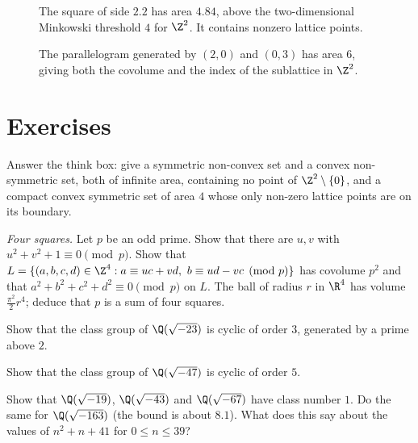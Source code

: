 \begin{figure}[ht]
\centering
{}
\caption{The square of side $2.2$ has area $4.84$, above the two-dimensional Minkowski threshold $4$ for $\Z^2$. It contains nonzero lattice points.}
\label{fig:v13-extra-05-a}
\end{figure}

\begin{figure}[ht]
\centering
{}
\caption{The parallelogram generated by $(2,0)$ and $(0,3)$ has area $6$, giving both the covolume and the index of the sublattice in $\Z^2$.}
\label{fig:v13-extra-05-b}
\end{figure}

\section{Exercises}

\begin{exercise}[$\star$]\label{ex:convexity}
Answer the think box: give a symmetric non-convex set and a convex non-symmetric set, both of infinite area, containing no
point of $\Z^2\setminus\{0\}$, and a compact convex symmetric set of area $4$ whose only non-zero lattice points are on its
boundary.
\end{exercise}

\begin{exercise}[$\star\star$]\label{ex:foursq}
\emph{Four squares.} Let $p$ be an odd prime. Show that there are $u,v$ with $u^2+v^2+1\equiv0\pmod p$. Show that
$L=\{(a,b,c,d)\in\Z^4:a\equiv uc+vd,\ b\equiv ud-vc\pmod p\}$ has covolume $p^2$ and that $a^2+b^2+c^2+d^2\equiv0\pmod p$
on $L$. The ball of radius $r$ in $\R^4$ has volume $\frac{\pi^2}2r^4$; deduce that $p$ is a sum of four squares.
\end{exercise}

\begin{exercise}[$\star\star$]\label{ex:h23}
Show that the class group of $\Q(\sqrt{-23})$ is cyclic of order $3$, generated by a prime above $2$.
\end{exercise}

\begin{exercise}[$\star\star$]\label{ex:h47}
Show that the class group of $\Q(\sqrt{-47})$ is cyclic of order $5$.
\end{exercise}

\begin{exercise}[$\star$]\label{ex:h1}
Show that $\Q(\sqrt{-19})$, $\Q(\sqrt{-43})$ and $\Q(\sqrt{-67})$ have class number $1$. Do the same for $\Q(\sqrt{-163})$
(the bound is about $8.1$). What does this say about the values of $n^2+n+41$ for $0\le n\le39$?
\end{exercise}

